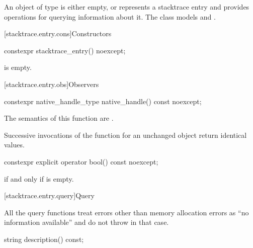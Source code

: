 \pnum
An object of type  is either empty,
or represents a stacktrace entry and
provides operations for querying information about it.
The class  models
 and
.

[stacktrace.entry.cons]{Constructors}

%
\begin{itemdecl}
constexpr stacktrace_entry() noexcept;
\end{itemdecl}

\begin{itemdescr}
\pnum
\ensures
{} is empty.
\end{itemdescr}

[stacktrace.entry.obs]{Observers}

%
\begin{itemdecl}
constexpr native_handle_type native_handle() const noexcept;
\end{itemdecl}

\begin{itemdescr}
\pnum
The semantics of this function are
.

\pnum
\remarks
Successive invocations of the  function
for an unchanged  object return identical values.
\end{itemdescr}

%
\begin{itemdecl}
constexpr explicit operator bool() const noexcept;
\end{itemdecl}

\begin{itemdescr}
\pnum
\returns
{} if and only if  is empty.
\end{itemdescr}

[stacktrace.entry.query]{Query}

\pnum
\begin{note}
All the  query functions treat
errors other than memory allocation errors
as ``no information available'' and do not throw in that case.
\end{note}

%
\begin{itemdecl}
string description() const;
\end{itemdecl}

